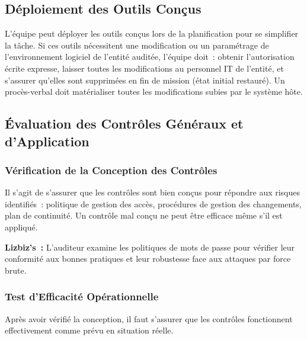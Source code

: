 \subsection{Déploiement des Outils Conçus}
\label{subsec:deploiement-outils}

L'équipe peut déployer les outils conçus lors de la planification pour se simplifier
la tâche. Si ces outils nécessitent une modification ou un paramétrage de
l'environnement logiciel de l'entité auditée, l'équipe doit~: obtenir l'autorisation
écrite expresse, laisser toutes les modifications au personnel IT de l'entité, et
s'assurer qu'elles sont supprimées en fin de mission (état initial restauré). Un
procès-verbal doit matérialiser toutes les modifications subies par le système hôte.

\subsection{Évaluation des Contrôles Généraux et d'Application}
\label{subsec:eval-controles}

\subsubsection{Vérification de la Conception des Contrôles}

Il s'agit de s'assurer que les contrôles sont bien conçus pour répondre aux risques
identifiés~: politique de gestion des accès, procédures de gestion des changements,
plan de continuité. Un contrôle mal conçu ne peut être efficace même s'il est
appliqué.

\begin{boxlizbiz}
\textbf{Lizbiz's~:}
L'auditeur examine les politiques de mots de passe pour vérifier leur conformité aux
bonnes pratiques et leur robustesse face aux attaques par force brute.
\end{boxlizbiz}

\subsubsection{Test d'Efficacité Opérationnelle}

Après avoir vérifié la conception, il faut s'assurer que les contrôles fonctionnent
effectivement comme prévu en situation réelle.

